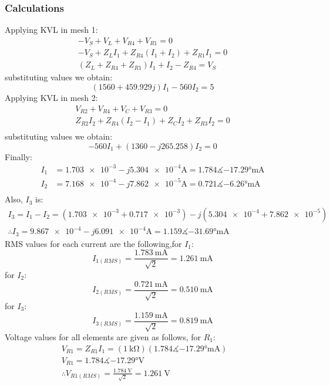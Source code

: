 \documentclass[letterpaper]{article}
\begin{document}
\subsubsection{Calculations}
Applying KVL in mesh 1:
\begin{gather*}
-V_S+V_L+V_{R4}+V_{R1} = 0\\
-V_S+Z_LI_1+Z_{R4}(I_1+I_2)+Z_{R1}I_1 = 0\\
(Z_L+Z_{R4}+Z_{R1})I_1+I_2-Z_{R4} = V_S
\end{gather*}
substituting values we obtain:
\begin{equation}
    (1560+ 459.929j)I_1-560I_2 = 5
    \label{eq:1}
\end{equation}
Applying KVL in mesh 2:
\begin{gather*}
V_{R2}+V_{R4}+V_C+V_{R3} = 0\\
Z_{R2}I_2+Z_{R4}(I_2-I_1)+Z_CI_2+Z_{R3}I_2 = 0\\
\end{gather*}
substituting values we obtain:
\begin{equation}
    -560I_1+(1360-j265.258)I_2 = 0
    \label{eq:2}
\end{equation}
Finally:
\begin{align*}
    I_1&=\num{1.703e-3}-j\num{5.304e-4}\si{\ampere} =
    \SI{1.784}\measuredangle\ang{-17.29}\si{\milli\ampere}\\
    I_2&=\num{7.168e-4}-j\num{7.862e-5}\si{\ampere} = 
    \SI{0.721}\measuredangle\ang{-6.26}\si{\milli\ampere}\\
\end{align*}
Also, $I_3$ is:
\begin{gather*}
    I_3 = I_1-I_2 = (\num{1.703e-3}+\num{0.717e-3})-j(\num{5.304e-4}+\num{7.862e-5})\\
    \therefore I_3 = \num{9.867e-4}-j\num{6.091e-4}\si{\ampere} =
    \SI{1.159}\measuredangle\ang{-31.69}\si{\milli\ampere}
\end{gather*}
RMS values for each current are the following,for $I_1$:
    \[I_{1(RMS)} = \frac{\SI{1.783}{\milli\ampere}}{\sqrt{2}} = \SI{1.261}{\milli\ampere}\]
for $I_2$:
    \[I_{2(RMS)} = \frac{\SI{0.721}{\milli\ampere}}{\sqrt{2}} = \SI{0.510}{\milli\ampere}\]
for $I_3$:
    \[I_{3(RMS)} = \frac{\SI{1.159}{\milli\ampere}}{\sqrt{2}} = \SI{0.819}{\milli\ampere}\]
Voltage values for all elements are given as follows, for $R_1$:
\begin{gather*}
    V_{R1} = Z_{R1}I_1 = (\SI{1}{\kilo\ohm})(1.784\measuredangle\ang{-17.29}\si{\milli\ampere})\qquad \\
    V_{R1} = 1.784\measuredangle\ang{-17.29}\si{\volt}\\
    \therefore V_{R1(RMS)} = \frac{\SI{1.784}{\volt}}{\sqrt{2}} = \SI{1.261}{\volt}
\end{gather*}
\end{document}
